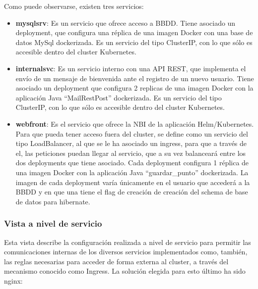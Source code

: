 \documentclass[12pt,spanish]{article}
\begin{document}
Como puede observarse, existen tres servicios:
\begin{itemize}
\item{\textbf{mysqlsrv}}: Es un servicio que ofrece acceso a BBDD. Tiene asociado un deployment, que configura una réplica de una imagen Docker con una base de datos MySql dockerizada. Es un servicio del tipo ClusterIP, con lo que sólo es accesible dentro del cluster Kubernetes.
\item{\textbf{internalsvc}}: Es un servicio interno con una API REST, que implementa el envío de un mensaje de bienvenida ante el registro de un nuevo usuario. Tiene asociado un deployment que configura 2 replicas de una imagen Docker con la aplicación Java “MailRestPost” dockerizada. Es un servicio del tipo ClusterIP, con lo que sólo es accesible dentro del cluster Kubernetes.
\item{\textbf{webfront}}: Es el servicio que ofrece la NBI de la aplicación Helm/Kubernetes. Para que pueda tener acceso fuera del cluster, se define como un servicio del tipo LoadBalancer, al que se le ha asociado un ingress, para que a través de el, las peticiones puedan llegar al servicio, que a su vez balanceará entre los dos deployments que tiene asociado. Cada deployment configura 1 réplica de una imagen Docker con la aplicación Java ``guardar\_punto'' dockerizada. La imagen de cada deployment varía únicamente en el usuario que accederá a la BBDD y en que una tiene el flag de creación de creación del schema de base de datos para hibernate.
\end{itemize}

\subsubsection{Vista a nivel de servicio}

Esta vista describe la configuración realizada a nivel de servicio para permitir las comunicaciones internas de los diversos servicios implementados como, también, las reglas necesarias para acceder de forma externa al cluster, a través del mecanismo conocido como Ingress. La solución elegida para esto último ha sido nginx:
\end{document}
